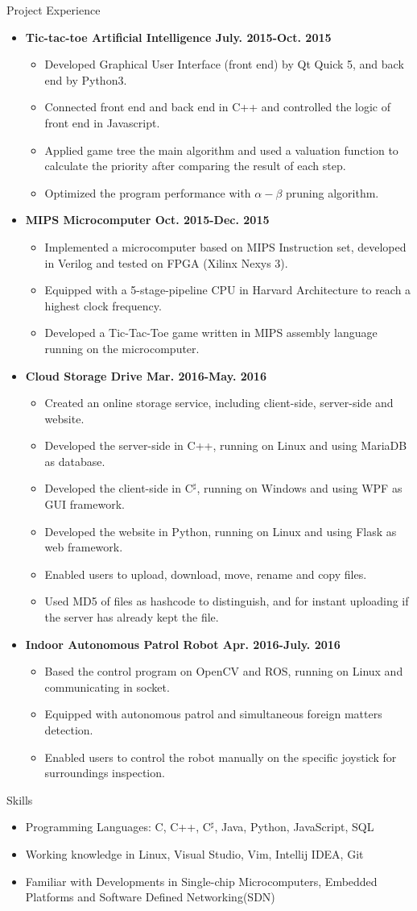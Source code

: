 \documentclass[10pt,oneside]{article}
\newenvironment{ressection}[1]{
	\vspace{4pt}
	{\fontfamily{phv}\selectfont\Large#1}
	\begin{itemize}
	\vspace{3pt}
}{
	\end{itemize}
}
\newcommand{\resitem}[1]{
	\vspace{-4pt}
	\item \begin{flushleft} #1 \end{flushleft}
}
\newcommand{\ressubitem}[1]{
	\vspace{-1pt}
	\item \begin{flushleft} #1 \end{flushleft}
}
\newenvironment{reslist}[1]{
	\resitem{\textbf{#1}}
	\vspace{-5pt}
	\begin{itemize}
}{
	\end{itemize}
}
\begin{document}
\begin{ressection}{Project Experience}
	\begin{reslist}{Tic-tac-toe Artificial Intelligence \hfill July. 2015-Oct. 2015}
		\ressubitem{Developed Graphical User Interface (front end) by Qt Quick 5, and back end by Python3.}
		\ressubitem{Connected front end and back end in C++ and controlled the logic of front end in Javascript.}
		\ressubitem{Applied game tree the main algorithm and used a valuation function to calculate the priority after comparing the result of each step.}
		\ressubitem{Optimized the program performance with $\alpha-\beta$ pruning algorithm.}
	\end{reslist}
	\begin{reslist}{MIPS Microcomputer \hfill Oct. 2015-Dec. 2015}
		\ressubitem{Implemented a microcomputer based on MIPS Instruction set, developed in Verilog and tested on FPGA (Xilinx Nexys 3). }
		\ressubitem{Equipped with a 5-stage-pipeline CPU in Harvard Architecture to reach a highest clock frequency.}
		\ressubitem{Developed a Tic-Tac-Toe game written in MIPS assembly language running on the microcomputer.}
	\end{reslist}
	\begin{reslist}{Cloud Storage Drive \hfill Mar. 2016-May. 2016}
		\ressubitem{Created an online storage service, including client-side, server-side and website.}
		\ressubitem{Developed the server-side in C++, running on Linux and using MariaDB as database.}
		\ressubitem{Developed the client-side in C$^\sharp$, running on Windows and using WPF as GUI framework.}
		\ressubitem{Developed the website in Python, running on Linux and using Flask as web framework.}
		\ressubitem{Enabled users to upload, download, move, rename and copy files.}
		\ressubitem{Used MD5 of files as hashcode to distinguish, and for instant uploading if the server has already kept the file.}
	\end{reslist}
	\begin{reslist}{Indoor Autonomous Patrol Robot \hfill Apr. 2016-July. 2016}
		\ressubitem{Based the control program on OpenCV and ROS, running on Linux and communicating in socket.}
		\ressubitem{Equipped with autonomous patrol and simultaneous foreign matters detection.}
		\ressubitem{Enabled users to control the robot manually on the specific joystick for surroundings inspection.}
	\end{reslist}
\end{ressection}

\begin{ressection}{Skills}

	\resitem{Programming Languages: C, C++, C$^\sharp$, Java, Python, JavaScript, SQL}
	\resitem{Working knowledge in Linux, Visual Studio, Vim, Intellij IDEA, Git}
	\resitem{Familiar with Developments in Single-chip Microcomputers, Embedded Platforms and Software Defined Networking(SDN)}
	
\end{ressection}
\end{document}
